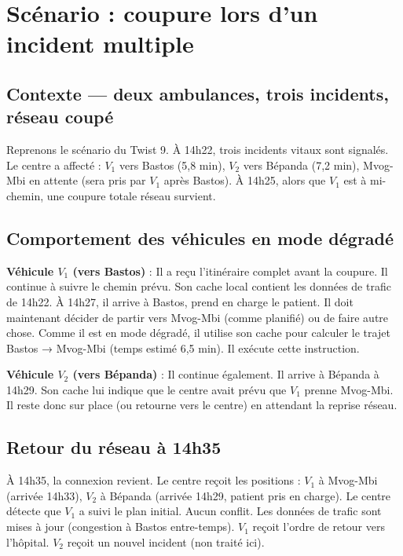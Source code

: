 \documentclass[12pt,a4paper]{article}
\theoremstyle{definition}
\theoremstyle{remark}
\begin{document}
\section{Scénario : coupure lors d’un incident multiple}

\subsection{Contexte — deux ambulances, trois incidents, réseau coupé}

Reprenons le scénario du Twist 9. À 14h22, trois incidents vitaux
sont signalés. Le centre a affecté : $V_1$ vers Bastos (5,8 min),
$V_2$ vers Bépanda (7,2 min), Mvog-Mbi en attente (sera pris par
$V_1$ après Bastos). À 14h25, alors que $V_1$ est à mi-chemin, une
coupure totale réseau survient.

\subsection{Comportement des véhicules en mode dégradé}

\textbf{Véhicule $V_1$ (vers Bastos)} : Il a reçu l’itinéraire complet
avant la coupure. Il continue à suivre le chemin prévu. Son cache
local contient les données de trafic de 14h22. À 14h27, il arrive à
Bastos, prend en charge le patient. Il doit maintenant décider de
partir vers Mvog-Mbi (comme planifié) ou de faire autre chose. Comme
il est en mode dégradé, il utilise son cache pour calculer le trajet
Bastos → Mvog-Mbi (temps estimé 6,5 min). Il exécute cette instruction.

\textbf{Véhicule $V_2$ (vers Bépanda)} : Il continue également. Il
arrive à Bépanda à 14h29. Son cache lui indique que le centre avait
prévu que $V_1$ prenne Mvog-Mbi. Il reste donc sur place (ou retourne
vers le centre) en attendant la reprise réseau.

\subsection{Retour du réseau à 14h35}

À 14h35, la connexion revient. Le centre reçoit les positions :
$V_1$ à Mvog-Mbi (arrivée 14h33), $V_2$ à Bépanda (arrivée 14h29,
patient pris en charge). Le centre détecte que $V_1$ a suivi le plan
initial. Aucun conflit. Les données de trafic sont mises à jour
(congestion à Bastos entre-temps). $V_1$ reçoit l’ordre de retour
vers l’hôpital. $V_2$ reçoit un nouvel incident (non traité ici).
\end{document}
